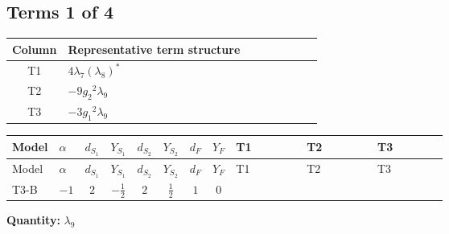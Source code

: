 \documentclass[8pt]{article}
\begin{document}
\begin{landscape}
\subsection*{Terms 1 of 4}
\begin{center}
\begin{tabular}{@{}c >{\raggedright\arraybackslash}p{0.82\linewidth}@{}}
\toprule
Column & Representative term structure \\
\midrule
T1 & \(\displaystyle 4 {\lambda_7} \left({\lambda_8}\right)^{*}\) \\
\midrule
T2 & \(\displaystyle -9 {g_2}^2 {\lambda_9}\) \\
\midrule
T3 & \(\displaystyle -3 {g_1}^2 {\lambda_9}\) \\
\midrule
\bottomrule
\end{tabular}
\end{center}
\smallskip
\tiny
\begin{longtable}{@{}llcccccc >{\raggedright\arraybackslash}p{0.21\linewidth} >{\raggedright\arraybackslash}p{0.21\linewidth} >{\raggedright\arraybackslash}p{0.21\linewidth}@{}}
\toprule
Model & $\alpha$ & $d_{S_1}$ & $Y_{S_1}$ & $d_{S_2}$ & $Y_{S_2}$ & $d_F$ & $Y_F$ & T1 & T2 & T3 \\
\midrule
\endfirsthead
\toprule
Model & $\alpha$ & $d_{S_1}$ & $Y_{S_1}$ & $d_{S_2}$ & $Y_{S_2}$ & $d_F$ & $Y_F$ & T1 & T2 & T3 \\
\midrule
\endhead
T3-B & $-1$ & $2$ & $-\frac{1}{2}$ & $2$ & $\frac{1}{2}$ & $1$ & $0$ & \scriptsize\adjustbox{max width=\linewidth}{$\begin{gathered} 4 {\lambda_7} \left({\lambda_8}\right)^{*}\end{gathered}$} & \scriptsize\adjustbox{max width=\linewidth}{$\begin{gathered} -9 {g_2}^2 {\lambda_9}\end{gathered}$} & \scriptsize\adjustbox{max width=\linewidth}{$\begin{gathered} -3 {g_1}^2 {\lambda_9}\end{gathered}$} \\
\midrule
\bottomrule
\end{longtable}
\clearpage
\noindent\textbf{Quantity: }$\lambda_{9}$\par\smallskip

\end{landscape}
\end{document}

